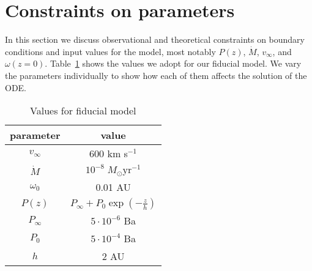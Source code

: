 \section{Constraints on parameters}
\label{sect:parameters}
In this section we discuss observational and theoretical constraints on boundary conditions and input values for the model, most notably $P(z)$, $\dot M$, $v_\infty$, and $\omega(z=0)$. Table~\ref{tab:fiducial} shows the values we adopt for our fiducial model. We vary the parameters individually to show how each of them affects the solution of the ODE. 
\begin{table}
\label{tab:fiducial}
\caption{Values for fiducial model}
\begin{tabular}{cc}
\hline\hline
parameter & value\\
\hline
$v_\infty$ & 600 km s$^{-1}$\\
$\dot M$ & $10^{-8}\;M_\odot\textrm{yr}^{-1}$\\
$\omega_0$ & 0.01 AU\\
$P(z)$ & $P_\infty+P_0\exp\left(-\frac{z}{h}\right)$\\
$P_\infty$ & $5\cdot 10^{-6}$ Ba\\
$P_0$ & $5\cdot 10^{-4}$ Ba\\
$h$ & 2 AU\\
\hline
\end{tabular}
\end{table}